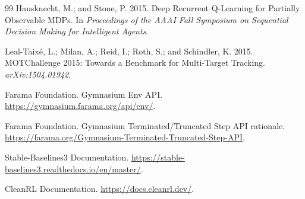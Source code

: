 \documentclass[letterpaper]{article}
\begin{document}
\begin{thebibliography}{99}
Hausknecht, M.; and Stone, P. 2015.
Deep Recurrent Q-Learning for Partially Observable MDPs.
In \textit{Proceedings of the AAAI Fall Symposium on Sequential Decision Making for Intelligent Agents}.

Leal-Taix\'e, L.; Milan, A.; Reid, I.; Roth, S.; and Schindler, K. 2015.
MOTChallenge 2015: Towards a Benchmark for Multi-Target Tracking.
\textit{arXiv:1504.01942}.

Farama Foundation.
Gymnasium Env API.
\url{https://gymnasium.farama.org/api/env/}.

Farama Foundation.
Gymnasium Terminated/Truncated Step API rationale.
\url{https://farama.org/Gymnasium-Terminated-Truncated-Step-API}.

Stable-Baselines3 Documentation.
\url{https://stable-baselines3.readthedocs.io/en/master/}.

CleanRL Documentation.
\url{https://docs.cleanrl.dev/}.
\end{thebibliography}
\end{document}
